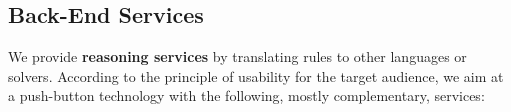 \documentclass[runningheads]{llncs}
\begin{document}
\subsection{Back-End Services}\label{sec:services}


We provide \textbf{reasoning services} by translating rules to other languages or
solvers. According to the principle of usability for the target audience, we
aim at a push-button technology with the following, mostly complementary, services:
\end{document}
